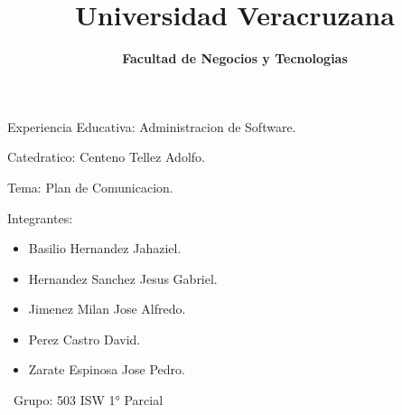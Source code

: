 \documentclass[40pt]{article}
\title{\textbf{Universidad Veracruzana} }
\date{\textbf{Facultad de Negocios y Tecnologias} }
\begin{document}
\maketitle
\textsf{\Large Experiencia Educativa: Administracion de Software. \\}
 
\maketitle
\textsf{\Large Catedratico: Centeno Tellez Adolfo. \\}

\maketitle
\textsf{\Large Tema: Plan de Comunicacion. \\}

\maketitle
\textsf{\Large Integrantes: \\}
\begin{itemize}
    \item Basilio Hernandez Jahaziel.
    \item Hernandez Sanchez Jesus Gabriel.
    \item Jimenez Milan Jose Alfredo.
    \item Perez Castro David.
    \item Zarate Espinosa Jose Pedro.   
\end{itemize}

\maketitle
\textsf{\ Grupo: 503 ISW   1° Parcial \\}
\end{document}
